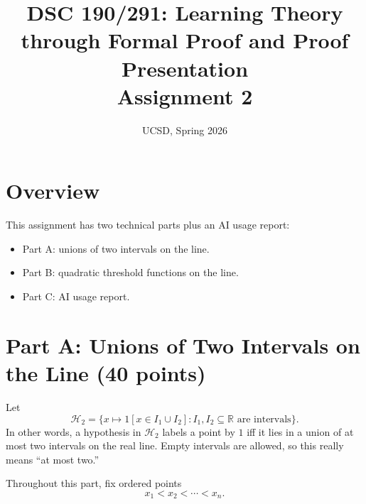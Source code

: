 \documentclass{article}
\title{DSC 190/291: Learning Theory through Formal Proof and Proof Presentation\\Assignment 2}
\date{UCSD, Spring 2026}
\begin{document}
\maketitle

\section{Overview}

This assignment has two technical parts plus an AI usage report:
\begin{itemize}
\item Part A: unions of two intervals on the line.
\item Part B: quadratic threshold functions on the line.
\item Part C: AI usage report.
\end{itemize}

\section{Part A: Unions of Two Intervals on the Line (40 points)}

Let
$$
\mathcal{H}_2
=
\{x \mapsto 1[x \in I_1 \cup I_2] : I_1, I_2 \subseteq \mathbb{R} \text{ are intervals}\}.
$$
In other words, a hypothesis in $\mathcal{H}_2$ labels a point by $1$ iff it lies in a union of at most two intervals on the real line. Empty intervals are allowed, so this really means ``at most two.''

Throughout this part, fix ordered points
$$
x_1 < x_2 < \cdots < x_n.
$$
\end{document}
